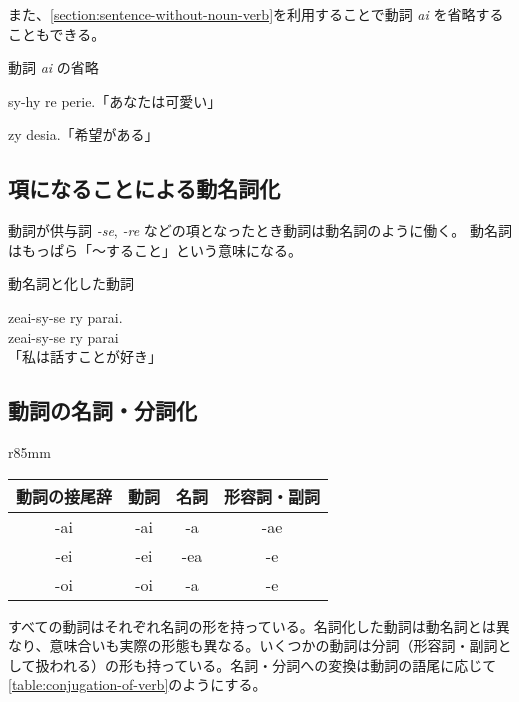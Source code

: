 また、\cref{section:sentence-without-noun-verb}を利用することで動詞 \emph{ai} を省略することもできる。

\begin{itembox}[l]{動詞 \emph{ai} の省略}
    \begin{pindent}
        \noindent
        sy-hy re perie.「あなたは可愛い」

        \noindent
        zy desia.「希望がある」
    \end{pindent}
\end{itembox}

\subsection{項になることによる動名詞化}

動詞が供与詞 \emph{-se}, \emph{-re} などの項となったとき動詞は動名詞のように働く。
動名詞はもっぱら「～すること」という意味になる。

\begin{itembox}[l]{動名詞と化した動詞}
    \begin{pindent}
        \noindent
        zeai-sy-se ry parai. \\
        zeai-sy-se
            ry parai \\
        「私は話すことが好き」
    \end{pindent}
\end{itembox}

\subsection{動詞の名詞・分詞化}

\begin{wraptable}[7]{r}{85mm}
    \centering
    \caption{動詞の名詞・分詞化}
    \label{table:conjugation-of-verb}
    \begin{tabular}{cccc}
        \toprule
        動詞の接尾辞 & 動詞 & 名詞 & 形容詞・副詞 \\
        \midrule
        -ai & -ai & -a  & -ae \\
        -ei & -ei & -ea & -e  \\
        -oi & -oi & -a  & -e \\
        \bottomrule
    \end{tabular}
\end{wraptable}

すべての動詞はそれぞれ名詞の形を持っている。名詞化した動詞は動名詞とは異なり、意味合いも実際の形態も異なる。いくつかの動詞は分詞（形容詞・副詞として扱われる）の形も持っている。名詞・分詞への変換は動詞の語尾に応じて\cref{table:conjugation-of-verb}のようにする。


